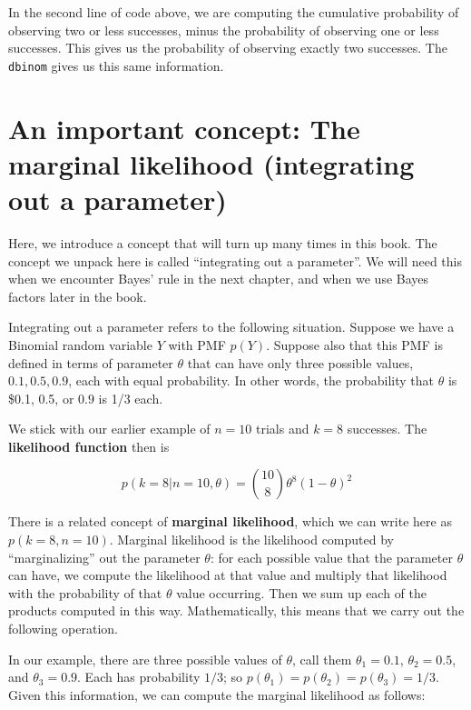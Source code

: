 \documentclass[12pt,]{krantz}
\begin{document}
In the second line of code above, we are computing the cumulative probability of observing two or less successes, minus the probability of observing one or less successes. This gives us the probability of observing exactly two successes. The \texttt{dbinom} gives us this same information.

\hypertarget{an-important-concept-the-marginal-likelihood-integrating-out-a-parameter}{%
\section{An important concept: The marginal likelihood (integrating out a parameter)}\label{an-important-concept-the-marginal-likelihood-integrating-out-a-parameter}}

Here, we introduce a concept that will turn up many times in this book. The concept we unpack here is called ``integrating out a parameter''. We will need this when we encounter Bayes' rule in the next chapter, and when we use Bayes factors later in the book.

Integrating out a parameter refers to the following situation. Suppose we have a Binomial random variable \(Y\) with PMF \(p(Y)\). Suppose also that this PMF is defined in terms of parameter \(\theta\) that can have only three possible values, \(0.1, 0.5, 0.9\), each with equal probability. In other words, the probability that \(\theta\) is \$0.1, 0.5, or \(0.9\) is 1/3 each.

We stick with our earlier example of \(n=10\) trials and \(k=8\) successes.
The \textbf{likelihood function} then is

\begin{equation}
p(k=8|n=10,\theta) = \binom{10}{8} \theta^8 (1-\theta)^{2}
\end{equation}

There is a related concept of \textbf{marginal likelihood}, which we can write here as \(p(k=8,n=10)\). Marginal likelihood is the likelihood computed by ``marginalizing'' out the parameter \(\theta\): for each possible value that the parameter \(\theta\) can have, we compute the likelihood at that value and multiply that likelihood with the probability of that \(\theta\) value occurring. Then we sum up each of the products computed in this way. Mathematically, this means that we carry out the following operation.

In our example, there are three possible values of \(\theta\),
call them \(\theta_1=0.1\), \(\theta_2=0.5\), and \(\theta_3=0.9\). Each has probability \(1/3\); so \(p(\theta_1)=p(\theta_2)=p(\theta_3)=1/3\). Given this information, we can compute the marginal likelihood as follows:
\end{document}
